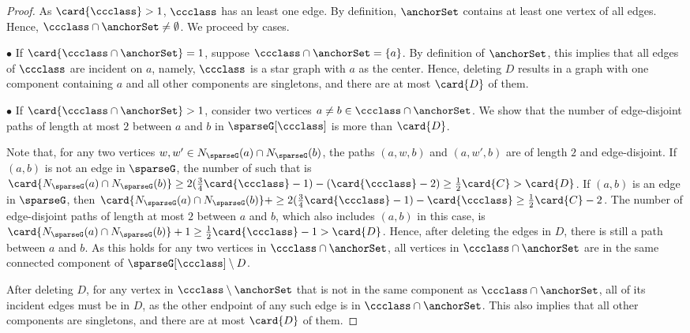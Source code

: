 \begin{proof}
    As $ \card{\ccclass} > 1 $, $ \ccclass $ has an least one edge.
    By definition, $ \anchorSet $ contains at least one vertex of all edges.
    Hence, $ \ccclass \cap \anchorSet \neq \emptyset $.
    We proceed by cases.

    $ \bullet $ If $ \card{\ccclass \cap \anchorSet} = 1 $, suppose $ \ccclass \cap \anchorSet = \{ a \} $.
    By definition of $ \anchorSet $, this implies that all edges of $ \ccclass $ are incident on $ a $, namely, $ \ccclass $ is a star graph with $ a $ as the center.
    Hence, deleting $ D $ results in a graph with one component containing $ a $ and all other components are singletons, and there are at most $ \card{D} $ of them.

    $ \bullet $ If $ \card{\ccclass \cap \anchorSet} > 1 $, consider two vertices $ a \neq b \in \ccclass \cap \anchorSet $. We show that the number of edge-disjoint paths of length at most $ 2 $ between $ a $ and $ b $ in $ \sparseG[\ccclass] $ is more than $ \card{D} $.

    Note that, for any two vertices $ w, w' \in \openN{\sparseG}{a} \cap \openN{\sparseG}{b} $, the paths $ (a,w,b) $ and $ (a,w',b) $ are of length $ 2 $ and edge-disjoint.
    If $ (a,b) $ is not an edge in $ \sparseG $, the number of such that is $ \card{\openN{\sparseG}{a} \cap \openN{\sparseG}{b}} \geq 2(\frac{3}{4}\card{\ccclass}-1) - (\card{\ccclass} - 2) \geq \frac{1}{2}\card{C} > \card{D} $.
    If $ (a,b) $ is an edge in $ \sparseG $, then $ \card{\openN{\sparseG}{a} \cap \openN{\sparseG}{b}} + \geq 2(\frac{3}{4}\card{\ccclass}-1) - \card{\ccclass} \geq \frac{1}{2}\card{C} - 2 $.
    The number of edge-disjoint paths of length at most $ 2 $ between $ a $ and $ b $, which also includes $ (a,b) $ in this case, is $ \card{\openN{\sparseG}{a} \cap \openN{\sparseG}{b}} + 1 \geq \frac{1}{2}\card{\ccclass} - 1 > \card{D} $.
    Hence, after deleting the edges in $ D $, there is still a path between $ a $ and $ b $.
    As this holds for any two vertices in $ \ccclass \cap \anchorSet $, all vertices in $ \ccclass \cap \anchorSet $ are in the same connected component of $ \sparseG[\ccclass]\setminus D $.

    After deleting $ D $, for any vertex in $ \ccclass \setminus \anchorSet $ that is not in the same component as $ \ccclass \cap \anchorSet $, all of its incident edges must be in $ D $, as the other endpoint of any such edge is in $ \ccclass \cap \anchorSet $.
    This also implies that all other components are singletons, and there are at most $ \card{D} $ of them.

\end{proof}
